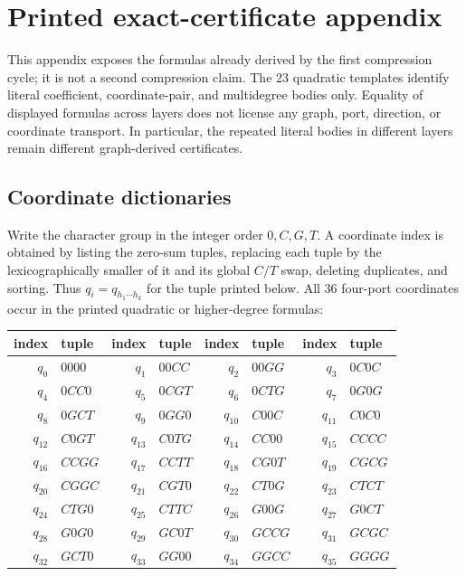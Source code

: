 \section{Printed exact-certificate appendix}\label{sec:printed-certificates}

This appendix exposes the formulas already derived by the first compression
cycle; it is not a second compression claim.  The 23 quadratic templates identify literal coefficient, coordinate-pair, and multidegree bodies only.  Equality of displayed formulas across layers does not license any graph, port, direction, or coordinate transport.
In particular, the repeated literal bodies in different layers remain
different graph-derived certificates.

\subsection{Coordinate dictionaries}

Write the character group in the integer order \(0,C,G,T\).  A coordinate
index is obtained by listing the zero-sum tuples, replacing each tuple by the
lexicographically smaller of it and its global \(C/T\) swap, deleting
duplicates, and sorting.  Thus \(q_i=q_{h_1\cdots h_k}\) for the tuple printed
below.  All 36 four-port coordinates occur in the printed quadratic or
higher-degree formulas:

\begin{center}\footnotesize
\begin{tabular}{r lr lr lr l}
\toprule
index & tuple & index & tuple & index & tuple & index & tuple\\
\midrule
$q_{0}$ & $0000$ & $q_{1}$ & $00CC$ & $q_{2}$ & $00GG$ & $q_{3}$ & $0C0C$\\
$q_{4}$ & $0CC0$ & $q_{5}$ & $0CGT$ & $q_{6}$ & $0CTG$ & $q_{7}$ & $0G0G$\\
$q_{8}$ & $0GCT$ & $q_{9}$ & $0GG0$ & $q_{10}$ & $C00C$ & $q_{11}$ & $C0C0$\\
$q_{12}$ & $C0GT$ & $q_{13}$ & $C0TG$ & $q_{14}$ & $CC00$ & $q_{15}$ & $CCCC$\\
$q_{16}$ & $CCGG$ & $q_{17}$ & $CCTT$ & $q_{18}$ & $CG0T$ & $q_{19}$ & $CGCG$\\
$q_{20}$ & $CGGC$ & $q_{21}$ & $CGT0$ & $q_{22}$ & $CT0G$ & $q_{23}$ & $CTCT$\\
$q_{24}$ & $CTG0$ & $q_{25}$ & $CTTC$ & $q_{26}$ & $G00G$ & $q_{27}$ & $G0CT$\\
$q_{28}$ & $G0G0$ & $q_{29}$ & $GC0T$ & $q_{30}$ & $GCCG$ & $q_{31}$ & $GCGC$\\
$q_{32}$ & $GCT0$ & $q_{33}$ & $GG00$ & $q_{34}$ & $GGCC$ & $q_{35}$ & $GGGG$\\
\bottomrule
\end{tabular}
\end{center}

